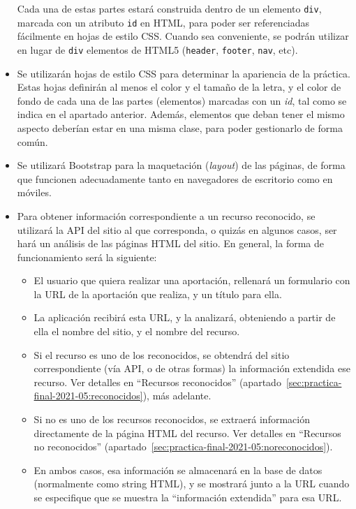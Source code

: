 \begin{itemize}
  Cada una de estas partes estará construida dentro de un elemento \texttt{div}, marcada con un atributo \texttt{id} en HTML, para poder ser referenciadas fácilmente en hojas de estilo CSS. Cuando sea conveniente, se podrán utilizar en lugar de \texttt{div} elementos de HTML5 (\texttt{header}, \texttt{footer}, \texttt{nav}, etc).

\item Se utilizarán hojas de estilo CSS para determinar la apariencia de la práctica. Estas hojas definirán al menos el color y el tamaño de la letra, y el color de fondo de cada una de las partes (elementos) marcadas con un \emph{id}, tal como se indica en el apartado anterior. Además, elementos que deban tener el mismo aspecto deberían estar en una misma clase, para poder gestionarlo de forma común.

\item Se utilizará Bootstrap para la maquetación (\emph{layout}) de las páginas, de forma que funcionen adecuadamente tanto en navegadores de escritorio como en móviles.
  
\item Para obtener información correspondiente a un recurso reconocido, se utilizará la API del sitio al que corresponda, o quizás en algunos casos, ser hará un análisis de las páginas HTML del sitio. En general, la forma de funcionamiento será la siguiente:

  \begin{itemize}
  \item El usuario que quiera realizar una aportación, rellenará un formulario con la URL de la aportación que realiza, y un título para ella.
  \item La aplicación recibirá esta URL, y la analizará, obteniendo a partir de ella el nombre del sitio, y el nombre del recurso.
  \item Si el recurso es uno de los reconocidos, se obtendrá del sitio correspondiente (vía API, o de otras formas) la información extendida ese recurso. Ver detalles en ``Recursos reconocidos'' (apartado~\ref{sec:practica-final-2021-05:reconocidos}), más adelante.
  \item Si no es uno de los recursos reconocidos, se extraerá información directamente de la página HTML del recurso. Ver detalles en ``Recursos no reconocidos'' (apartado~\ref{sec:practica-final-2021-05:noreconocidos}).
  \item En ambos casos, esa información se almacenará en la base de datos (normalmente como string HTML), y se mostrará junto a la URL cuando se especifique que se muestra la ``información extendida'' para esa URL.
  \end{itemize}

\end{itemize}

